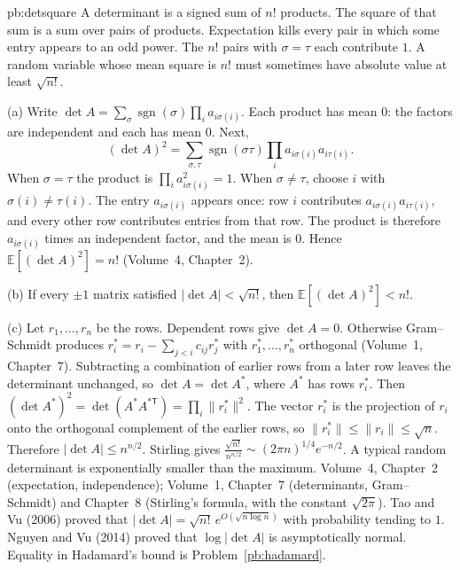 \begin{solution}{pb:detsquare}
\idea A determinant is a signed sum of $n!$ products. The square of that sum is a sum over pairs of products. Expectation kills every
pair in which some entry appears to an odd power. The $n!$ pairs with $\sigma=\tau$ each contribute $1$. A random
variable whose mean square is $n!$ must sometimes have absolute value at least $\sqrt{n!}$.

\writeup (a) Write $\det A=\sum_\sigma\operatorname{sgn}(\sigma)\prod_ia_{i\sigma(i)}$. Each product has mean $0$: the factors are
independent and each has mean $0$. Next,
\[
(\det A)^2=\sum_{\sigma,\tau}\operatorname{sgn}(\sigma\tau)\prod_ia_{i\sigma(i)}a_{i\tau(i)}.
\]
When $\sigma=\tau$ the product is $\prod_ia_{i\sigma(i)}^2=1$. When $\sigma\ne\tau$, choose $i$ with $\sigma(i)\ne\tau(i)$. The entry
$a_{i\sigma(i)}$ appears once: row $i$ contributes $a_{i\sigma(i)}a_{i\tau(i)}$, and every other row
contributes entries from that row. The product is therefore $a_{i\sigma(i)}$ times an independent factor, and the mean is $0$. Hence
$\mathbb E[(\det A)^2]=n!$ (Volume~4, Chapter~2).

(b) If every $\pm1$ matrix satisfied $|\det A|<\sqrt{n!}$, then $\mathbb E[(\det A)^2]<n!$.

(c) Let $r_1,\dots,r_n$ be the rows. Dependent rows give $\det A=0$. Otherwise Gram--Schmidt produces
$r_i^*=r_i-\sum_{j<i}c_{ij}r_j^*$ with $r_1^*,\dots,r_n^*$ orthogonal (Volume~1, Chapter~7). Subtracting a combination
of earlier rows from a later row leaves the determinant unchanged, so $\det A=\det A^*$, where $A^*$ has rows $r_i^*$. Then
$(\det A^*)^2=\det(A^*A^{*\mathsf T})=\prod_i\|r_i^*\|^2$. The vector $r_i^*$ is the projection of $r_i$ onto the orthogonal complement
of the earlier rows, so $\|r_i^*\|\le\|r_i\|\le\sqrt n$. Therefore $|\det A|\le n^{n/2}$. Stirling gives $\frac{\sqrt{n!}}{n^{n/2}}\sim
(2\pi n)^{1/4}e^{-n/2}$. A typical random determinant is exponentially smaller than the maximum.
\tools Volume~4, Chapter~2 (expectation, independence); Volume~1, Chapter~7 (determinants, Gram--Schmidt) and Chapter~8 (Stirling's formula, with the constant $\sqrt{2\pi}$).
\leads Tao and Vu (2006) proved that $|\det A|=\sqrt{n!}\,e^{O(\sqrt{n\log n})}$ with probability tending to $1$. Nguyen and
Vu (2014) proved that $\log|\det A|$ is asymptotically normal. Equality in Hadamard's bound is Problem~\ref{pb:hadamard}.
\end{solution}

